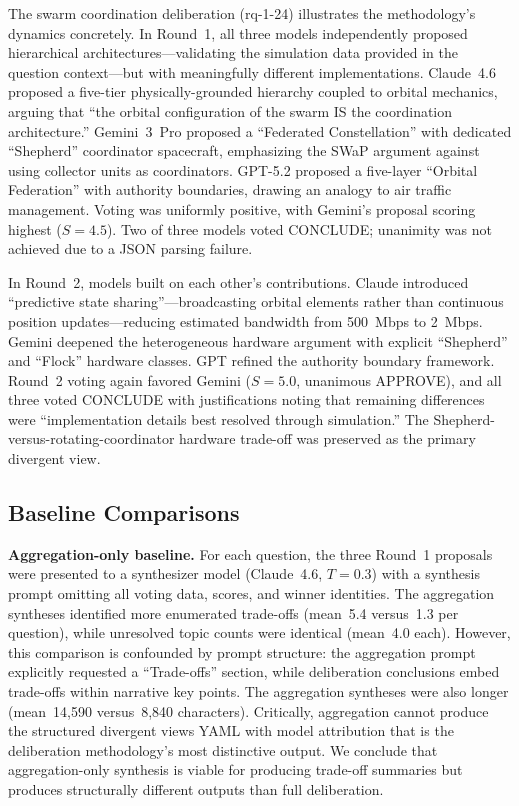 \documentclass[11pt,a4paper]{article}
\begin{document}
The swarm coordination deliberation (rq-1-24) illustrates the methodology's dynamics concretely. In Round~1, all three models independently proposed hierarchical architectures---validating the simulation data provided in the question context---but with meaningfully different implementations. Claude~4.6 proposed a five-tier physically-grounded hierarchy coupled to orbital mechanics, arguing that ``the orbital configuration of the swarm IS the coordination architecture.'' Gemini~3~Pro proposed a ``Federated Constellation'' with dedicated ``Shepherd'' coordinator spacecraft, emphasizing the SWaP argument against using collector units as coordinators. GPT-5.2 proposed a five-layer ``Orbital Federation'' with authority boundaries, drawing an analogy to air traffic management. Voting was uniformly positive, with Gemini's proposal scoring highest ($S = 4.5$). Two of three models voted CONCLUDE; unanimity was not achieved due to a JSON parsing failure.

In Round~2, models built on each other's contributions. Claude introduced ``predictive state sharing''---broadcasting orbital elements rather than continuous position updates---reducing estimated bandwidth from 500~Mbps to 2~Mbps. Gemini deepened the heterogeneous hardware argument with explicit ``Shepherd'' and ``Flock'' hardware classes. GPT refined the authority boundary framework. Round~2 voting again favored Gemini ($S = 5.0$, unanimous APPROVE), and all three voted CONCLUDE with justifications noting that remaining differences were ``implementation details best resolved through simulation.'' The Shepherd-versus-rotating-coordinator hardware trade-off was preserved as the primary divergent view.

\subsection{Baseline Comparisons}
\label{sec:baselines}

\textbf{Aggregation-only baseline.} For each question, the three Round~1 proposals were presented to a synthesizer model (Claude~4.6, $T = 0.3$) with a synthesis prompt omitting all voting data, scores, and winner identities. The aggregation syntheses identified more enumerated trade-offs (mean~5.4 versus~1.3 per question), while unresolved topic counts were identical (mean~4.0 each). However, this comparison is confounded by prompt structure: the aggregation prompt explicitly requested a ``Trade-offs'' section, while deliberation conclusions embed trade-offs within narrative key points. The aggregation syntheses were also longer (mean~14{,}590 versus~8{,}840 characters). Critically, aggregation cannot produce the structured divergent views YAML with model attribution that is the deliberation methodology's most distinctive output. We conclude that aggregation-only synthesis is viable for producing trade-off summaries but produces structurally different outputs than full deliberation.
\end{document}
